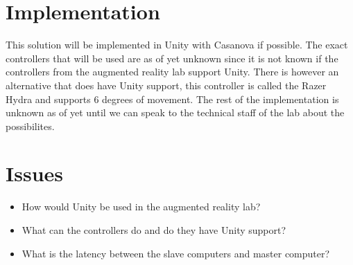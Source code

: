 \documentclass[10pt,a4paper]{article}
\begin{document}
\section{Implementation}
This solution will be implemented in Unity with Casanova if possible. The exact controllers that will be used are as of yet unknown since it is not known if the controllers from the augmented reality lab support Unity. There is however an alternative that does have Unity support, this controller is called the Razer Hydra and supports 6 degrees of movement. The rest of the implementation is unknown as of yet until we can speak to the technical staff of the lab about the possibilites.

\section{Issues}
\begin{itemize}
\item How would Unity be used in the augmented reality lab?
\item What can the controllers do and do they have Unity support?
\item What is the latency between the slave computers and master computer?
\end{itemize}
\end{document}
